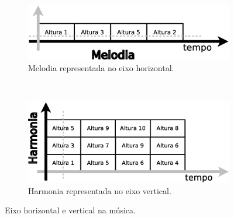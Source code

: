 \begin{figure}
    \centering
    \begin{subfigure}[b]{0.75\textwidth}
        \includegraphics[width=\textwidth]{chapters/cap-musica-basica/melodia}
        \caption{Melodia representada no eixo horizontal.}
        \label{fig:melodia}
    \end{subfigure}
    ~ %
    \begin{subfigure}[b]{0.75\textwidth}
        \includegraphics[width=\textwidth]{chapters/cap-musica-basica/harmonia}
        \caption{Harmonia representada no eixo vertical.}
        \label{fig:harmonia}
    \end{subfigure}
    \caption{Eixo horizontal e vertical na música.}\label{fig:meloharmo}
\end{figure}


